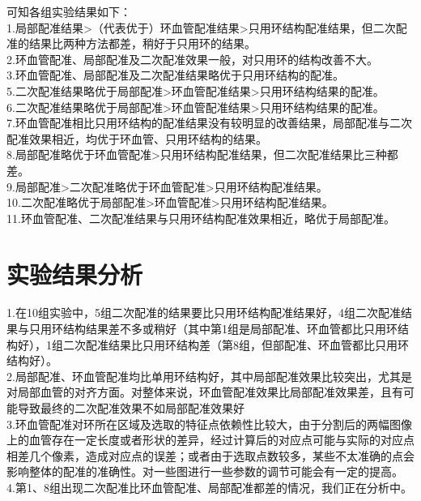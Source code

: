 \documentclass[12pt]{article}
\begin{document}
可知各组实验结果如下：\\
1.局部配准结果>（代表优于）环血管配准结果>只用环结构配准结果，但二次配准的结果比两种方法都差，稍好于只用环的结果。\\
2.环血管配准、局部配准及二次配准效果一般，对只用环的结构改善不大。\\
3.环血管配准、局部配准及二次配准结果略优于只用环结构的配准。\\
5.二次配准结果略优于局部配准>环血管配准结果>只用环结构结果的配准。\\
6.二次配准结果略优于局部配准>环血管配准结果>只用环结构结果的配准。\\
7.环血管配准相比只用环结构的配准结果没有较明显的改善结果，局部配准与二次配准效果相近，均优于环血管、只用环结构的结果。\\
8.局部配准略优于环血管配准>只用环结构配准结果，但二次配准结果比三种都差。\\
9.局部配准>二次配准略优于环血管配准>只用环结构配准结果。\\
10.二次配准略优于局部配准>环血管配准>只用环结构配准结果。\\
11.环血管配准、二次配准结果与只用环结构配准效果相近，略优于局部配准。

\section{实验结果分析}

\noindent 1.在10组实验中，5组二次配准的结果要比只用环结构配准结果好，4组二次配准结果与只用环结构结果差不多或稍好（其中第1组是局部配准、环血管都比只用环结构好），1组二次配准结果比只用环结构差（第8组，但部配准、环血管都比只用环结构好）。\\
2.局部配准、环血管配准均比单用环结构好，其中局部配准效果比较突出，尤其是对局部血管的对齐方面。对整体来说，环血管配准效果比局部配准效果差，且有可能导致最终的二次配准效果不如局部配准效果好\\
3.环血管配准对环所在区域及选取的特征点依赖性比较大，由于分割后的两幅图像上的血管存在一定长度或者形状的差异，经过计算后的对应点可能与实际的对应点相差几个像素，造成对应点的误差；或者由于选取点数较多，某些不太准确的点会影响整体的配准的准确性。对一些图进行一些参数的调节可能会有一定的提高。\\
4.第1、8组出现二次配准比环血管配准、局部配准都差的情况，我们正在分析中。\\


\end{document}
